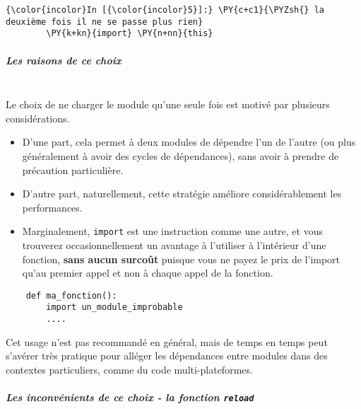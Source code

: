     \begin{Verbatim}[commandchars=\\\{\}]
{\color{incolor}In [{\color{incolor}5}]:} \PY{c+c1}{\PYZsh{} la deuxième fois il ne se passe plus rien}
        \PY{k+kn}{import} \PY{n+nn}{this}
\end{Verbatim}


    \hypertarget{les-raisons-de-ce-choix}{%
\subparagraph{Les raisons de ce choix\\\\}\label{les-raisons-de-ce-choix}}

    Le choix de ne charger le module qu'une seule fois est motivé par
plusieurs considérations.

    \begin{itemize}
\tightlist
\item
  D'une part, cela permet à deux modules de dépendre l'un de l'autre (ou
  plus généralement à avoir des cycles de dépendances), sans avoir à
  prendre de précaution particulière.
\end{itemize}

    \begin{itemize}
\tightlist
\item
  D'autre part, naturellement, cette stratégie améliore considérablement
  les performances.
\end{itemize}

    \begin{itemize}
\tightlist
\item
  Marginalement, \texttt{import} est une instruction comme une autre, et
  vous trouverez occasionnellement un avantage à l'utiliser à
  l'intérieur d'une fonction, \textbf{sans aucun surcoût} puisque vous
  ne payez le prix de l'import qu'au premier appel et non à chaque appel
  de la fonction.
\end{itemize}

\begin{verbatim}
    def ma_fonction():
        import un_module_improbable
        ....
\end{verbatim}

Cet usage n'est pas recommandé en général, mais de temps en temps peut
s'avérer très pratique pour alléger les dépendances entre modules dans
des contextes particuliers, comme du code multi-plateformes.

    \hypertarget{les-inconvuxe9nients-de-ce-choix---la-fonction-reload}{%
\subparagraph{\texorpdfstring{Les inconvénients de ce choix - la
fonction
\texttt{reload}}{Les inconvénients de ce choix - la fonction reload}\\\\}\label{les-inconvuxe9nients-de-ce-choix---la-fonction-reload}}

